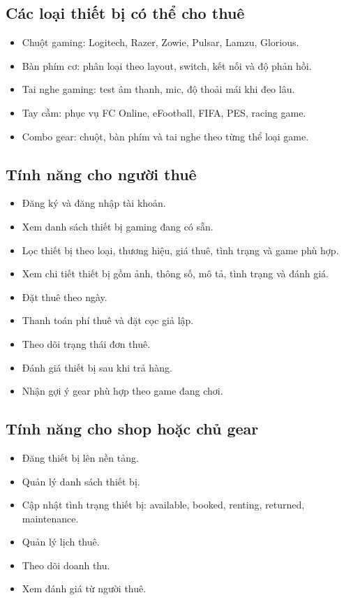 \subsection{Các loại thiết bị có thể cho thuê}

\begin{itemize}
    \item Chuột gaming: Logitech, Razer, Zowie, Pulsar, Lamzu, Glorious.
    \item Bàn phím cơ: phân loại theo layout, switch, kết nối và độ phản hồi.
    \item Tai nghe gaming: test âm thanh, mic, độ thoải mái khi đeo lâu.
    \item Tay cầm: phục vụ FC Online, eFootball, FIFA, PES, racing game.
    \item Combo gear: chuột, bàn phím và tai nghe theo từng thể loại game.
\end{itemize}

\subsection{Tính năng cho người thuê}

\begin{itemize}
    \item Đăng ký và đăng nhập tài khoản.
    \item Xem danh sách thiết bị gaming đang có sẵn.
    \item Lọc thiết bị theo loại, thương hiệu, giá thuê, tình trạng và game phù hợp.
    \item Xem chi tiết thiết bị gồm ảnh, thông số, mô tả, tình trạng và đánh giá.
    \item Đặt thuê theo ngày.
    \item Thanh toán phí thuê và đặt cọc giả lập.
    \item Theo dõi trạng thái đơn thuê.
    \item Đánh giá thiết bị sau khi trả hàng.
    \item Nhận gợi ý gear phù hợp theo game đang chơi.
\end{itemize}

\subsection{Tính năng cho shop hoặc chủ gear}

\begin{itemize}
    \item Đăng thiết bị lên nền tảng.
    \item Quản lý danh sách thiết bị.
    \item Cập nhật tình trạng thiết bị: available, booked, renting, returned, maintenance.
    \item Quản lý lịch thuê.
    \item Theo dõi doanh thu.
    \item Xem đánh giá từ người thuê.
\end{itemize}

